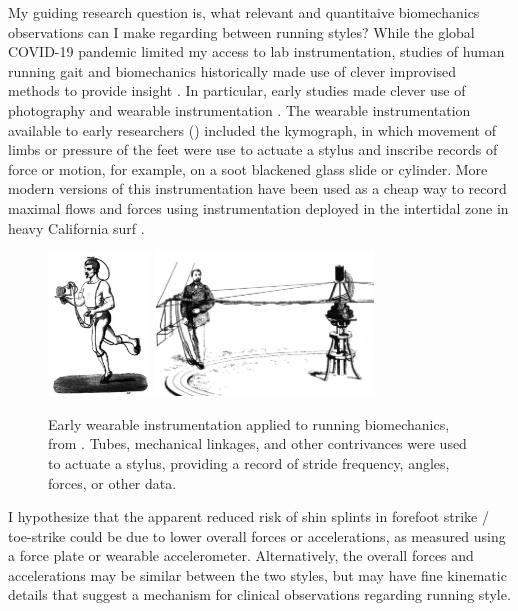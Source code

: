 My guiding research question is, what relevant and quantitaive biomechanics observations can I make regarding between running styles?  While the global COVID-19 pandemic limited my access to lab instrumentation, studies of human running gait and biomechanics historically made use of clever improvised methods to provide insight \citep{baker2007history, mcmahon1984muscles, mayer2010physiological, marey1873locomotion, carlet1872essai, muybridge1901human}. In particular, early studies made clever use of photography \citep{muybridge1901human, baker2007history, mcmahon1984muscles, mayer2010physiological} and wearable instrumentation \citep{marey1873locomotion, carlet1872essai, baker2007history, mayer2010physiological}. The wearable instrumentation available to early researchers () included the kymograph, in which movement of limbs or pressure of the feet were use to actuate a stylus and inscribe records of force or motion, for example, on a soot blackened glass slide or cylinder. More modern versions of this instrumentation have been used as a cheap way to record maximal flows and forces using instrumentation deployed in the intertidal zone in heavy California surf \citep{bell1984quantifying, denny1983simple}.
\begin{figure}
\begin{center}
\includegraphics[height=1.5in]{figures/intro3.png}\hspace{0.5in}
\includegraphics[height=1.5in]{figures/intro4.png}
\end{center}
\caption{Early wearable instrumentation applied to running biomechanics, from \citep{marey1873locomotion, carlet1872essai}. Tubes, mechanical linkages, and other contrivances were used to actuate a stylus, providing a record of stride frequency, angles, forces, or other data.} 
\label{fig:intro}
\end{figure}

I hypothesize that the apparent reduced risk of shin splints in forefoot strike / toe-strike could be due to lower overall forces or accelerations, as measured using a force plate or wearable accelerometer. Alternatively, the overall forces and accelerations may be similar between the two styles, but may have fine kinematic details that suggest a mechanism for clinical observations regarding running style. 



